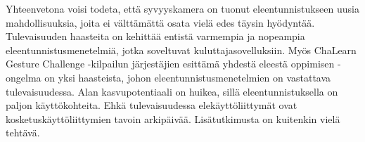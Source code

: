 Yhteenvetona voisi todeta, että syvyyskamera on tuonut eleentunnistukseen uusia mahdollisuuksia, joita ei välttämättä osata vielä edes täysin hyödyntää.
Tulevaisuuden haasteita on kehittää entistä varmempia ja nopeampia eleentunnistusmenetelmiä, jotka soveltuvat kuluttajasovelluksiin.
Myös ChaLearn Gesture Challenge -kilpailun järjestäjien esittämä yhdestä eleestä oppimisen -ongelma on yksi haasteista, johon eleentunnistusmenetelmien on 
vastattava tulevaisuudessa. Alan kasvupotentiaali on huikea, sillä eleentunnistuksella on paljon käyttökohteita. Ehkä tulevaisuudessa elekäyttöliittymät
ovat kosketuskäyttöliittymien tavoin arkipäivää. Lisätutkimusta on kuitenkin vielä tehtävä.\\








